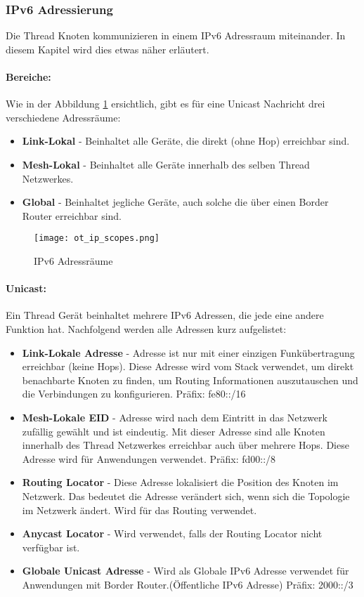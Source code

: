 \subsubsection{IPv6 Adressierung}\label{subsubsec:IPv6Adressierung}
Die Thread Knoten kommunizieren in einem IPv6 Adressraum miteinander. In diesem Kapitel wird dies etwas näher erläutert.
\paragraph{Bereiche:}
Wie in der Abbildung \ref{fig:IPv6Adressräume} ersichtlich, gibt es für eine Unicast Nachricht drei verschiedene Adressräume:

\begin{itemize}
	\item \textbf{Link-Lokal} - Beinhaltet alle Geräte, die direkt (ohne Hop) erreichbar sind.
	\item \textbf{Mesh-Lokal} - Beinhaltet alle Geräte innerhalb des selben Thread Netzwerkes.
	\item \textbf{Global} - Beinhaltet jegliche Geräte, auch solche die über einen Border Router erreichbar sind.
\end{itemize}

\begin{figure}[H]
	\centering
	\texttt{[image: ot\_ip\_scopes.png]}
	\caption{IPv6 Adressräume \cite{openthread_ot-primer-scopes_2xpng_2016}}\label{fig:IPv6Adressräume}
\end{figure}

\paragraph{Unicast:}
Ein Thread Gerät beinhaltet mehrere IPv6 Adressen, die jede eine andere Funktion hat. Nachfolgend werden alle Adressen kurz aufgelistet:

\begin{itemize}
	\item \textbf{Link-Lokale Adresse} - Adresse ist nur mit einer einzigen Funkübertragung erreichbar (keine Hops). Diese Adresse wird vom Stack verwendet, um direkt benachbarte Knoten zu finden, um Routing Informationen auszutauschen und die Verbindungen zu konfigurieren. Präfix: fe80::/16
	\item \textbf{Mesh-Lokale EID} - Adresse wird nach dem Eintritt in das Netzwerk zufällig gewählt und ist eindeutig. Mit dieser Adresse sind alle Knoten innerhalb des Thread Netzwerkes erreichbar auch über mehrere Hops. Diese Adresse wird für Anwendungen verwendet. Präfix: fd00::/8
	\item \textbf{Routing Locator} - Diese Adresse lokalisiert die Position des Knoten im Netzwerk. Das bedeutet die Adresse verändert sich, wenn sich die Topologie im Netzwerk ändert. Wird für das Routing verwendet.
	\item \textbf{Anycast Locator} - Wird verwendet, falls der Routing Locator nicht verfügbar ist.
	\item \textbf{Globale Unicast Adresse} - Wird als Globale IPv6 Adresse verwendet für Anwendungen mit Border Router.(Öffentliche IPv6 Adresse) Präfix: 2000::/3
\end{itemize}

